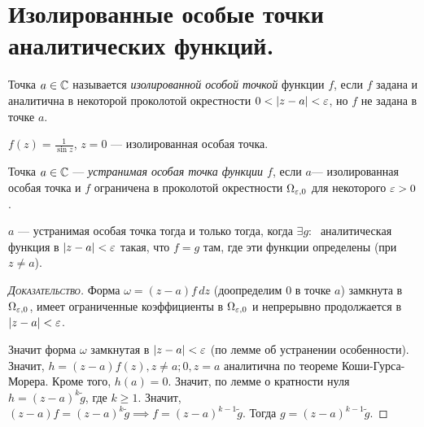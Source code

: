 \documentclass[../../main.tex]{subfiles}
\begin{document}
\newpage
\section{Изолированные особые точки аналитических функций.}
\begin{df}
 Точка $ a \in \mathbb{C} $ называется \textit{изолированной особой точкой} функции $ f $, если $ f $ задана и аналитична в некоторой проколотой окрестности $ 0 < \left| z-a \right| < \varepsilon $, но $ f $ не задана в точке $ a $.
\end{df}
\begin{exmpl}
 $ f(z) = \frac{1}{\sin z} $, $ z = 0 $ --- изолированная особая точка.
\end{exmpl}

\begin{df}
 Точка $ a \in \mathbb{C} $ --- \textit{устранимая особая точка функции $ f $}, если $ a $--- изолированная особая точка и $ f $ ограничена в проколотой окрестности $ \Omega_{\varepsilon,0} $ для некоторого $ \varepsilon > 0 $.
\end{df}
\begin{lm}
 $ a $ --- устранимая особая точка тогда и только тогда, когда $ \exists  g  \colon\;  $ аналитическая функция в $ \left| z-a \right| < \varepsilon $ такая, что $ f=g $ там, где эти функции определены (при $ z \neq a $).
\end{lm}
\begin{proof}[\normalfont\textsc{Доказательство}]
 Форма $ \omega = (z-a)f\,dz $ (доопределим $ 0 $ в точке $ a $) замкнута в $ \Omega_{\varepsilon,0} $, имеет ограниченные коэффициенты в $ \Omega_{\varepsilon,0} $ и непрерывно продолжается в $ \left| z-a \right| < \varepsilon $.

 Значит форма $ \omega $ замкнутая в $ \left| z-a \right| < \varepsilon $ (по лемме об устранении особенности). Значит, $ h = (z-a)f(z), z \neq a; 0 , z = a$ аналитична по теореме Коши-Гурса-Морера. Кроме того, $ h(a) = 0 $. Значит, по лемме о кратности нуля $ h = (z-a)^{k}\tilde g $, где $ k \geqslant 1 $. Значит, $ (z-a)f = (z-a)^{k}\tilde g \implies f = (z-a)^{k-1}\tilde g $. Тогда $ g = (z-a)^{k-1}\tilde g $.
\end{proof}
\end{document}
